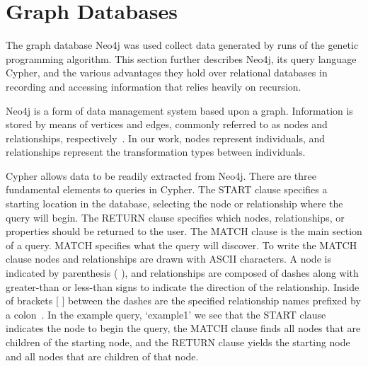 \documentclass[12pt]{article}
\begin{document}





\section{Graph Databases}
\label{sec:Graph Databases}

The graph database Neo4j was used collect data generated by runs of the genetic programming algorithm. This section further describes Neo4j, its query language Cypher, and the various advantages they hold over relational databases in recording and accessing information that relies heavily on recursion.

Neo4j is a form of data management system based upon a graph. Information is stored by means of vertices and edges, commonly referred to as nodes and relationships, respectively~\cite{GraphDatabases:2013}. In our work, nodes represent individuals, and relationships represent the transformation types between individuals.

Cypher allows data to be readily extracted from Neo4j. There are three fundamental elements to queries in Cypher. The START clause specifies a starting location in the database, selecting the node or relationship where the query will begin. The RETURN clause specifies which nodes, relationships, or properties should be returned to the user. The MATCH clause is the main section of a query. MATCH specifies what the query will discover. To write the MATCH clause nodes and relationships are drawn with ASCII characters. A node is indicated by parenthesis ( ), and relationships are composed of dashes along with greater-than or less-than signs to indicate the direction of the relationship. Inside of brackets [ ] between the dashes are the specified relationship names prefixed by a colon~\cite{GraphDatabases:2013}. In the example query, ‘example1’ we see that the START clause indicates the node to begin the query, the MATCH clause finds all nodes that are children of the starting node, and the RETURN clause yields the starting node and all nodes that are children of that node.
\end{document}
